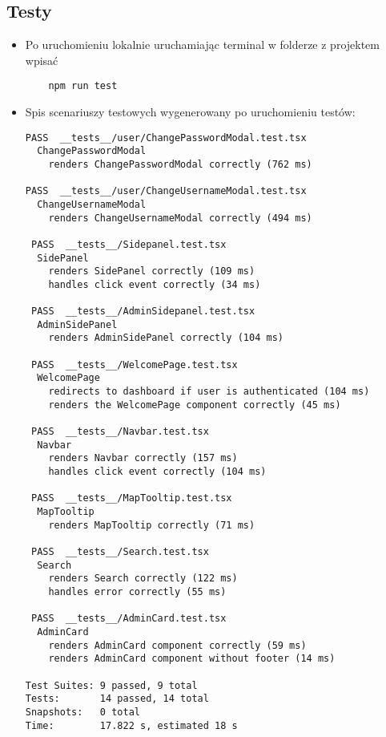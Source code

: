 \documentclass{article}
\begin{document}
            \subsection{Testy}
                \begin{itemize}
                    \item Po uruchomieniu lokalnie uruchamiając terminal w folderze z projektem wpisać
                        \begin{lstlisting}
    npm run test
                        \end{lstlisting}
                    \item Spis scenariuszy testowych wygenerowany po uruchomieniu testów:
                                    \begin{lstlisting}
PASS  __tests__/user/ChangePasswordModal.test.tsx
  ChangePasswordModal
    renders ChangePasswordModal correctly (762 ms)

PASS  __tests__/user/ChangeUsernameModal.test.tsx
  ChangeUsernameModal
    renders ChangeUsernameModal correctly (494 ms)

 PASS  __tests__/Sidepanel.test.tsx
  SidePanel
    renders SidePanel correctly (109 ms)
    handles click event correctly (34 ms)

 PASS  __tests__/AdminSidepanel.test.tsx
  AdminSidePanel
    renders AdminSidePanel correctly (104 ms)

 PASS  __tests__/WelcomePage.test.tsx
  WelcomePage
    redirects to dashboard if user is authenticated (104 ms)
    renders the WelcomePage component correctly (45 ms)

 PASS  __tests__/Navbar.test.tsx
  Navbar
    renders Navbar correctly (157 ms)
    handles click event correctly (104 ms)

 PASS  __tests__/MapTooltip.test.tsx
  MapTooltip
    renders MapTooltip correctly (71 ms)

 PASS  __tests__/Search.test.tsx
  Search
    renders Search correctly (122 ms)
    handles error correctly (55 ms)

 PASS  __tests__/AdminCard.test.tsx
  AdminCard
    renders AdminCard component correctly (59 ms)
    renders AdminCard component without footer (14 ms)

Test Suites: 9 passed, 9 total
Tests:       14 passed, 14 total
Snapshots:   0 total
Time:        17.822 s, estimated 18 s

                \end{lstlisting}
            \end{itemize}
\end{document}
